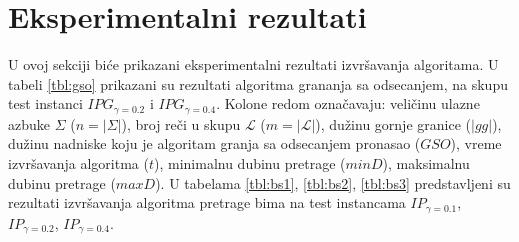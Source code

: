 \documentclass[12pt,oneside]{memoir}
\begin{document}
\section{Eksperimentalni rezultati}
\label{sec:ekspRezultati}
U ovoj sekciji biće prikazani eksperimentalni rezultati izvršavanja algoritama.
U tabeli \ref{tbl:gso} prikazani su rezultati algoritma grananja sa odsecanjem,
na skupu test instanci $IPG_{\gamma=0.2}$ i $IPG_{\gamma=0.4}$. 
Kolone redom označavaju: veličinu ulazne azbuke $\Sigma$ ($n=|\Sigma|$),
broj reči u skupu $\mathcal{L}$ ($m=|\mathcal{L}|$), dužinu gornje granice ($|gg|$),
dužinu nadniske koju je algoritam granja sa odsecanjem pronasao ($GSO$),
vreme izvršavanja algoritma ($t$),
minimalnu dubinu pretrage ($minD$),
maksimalnu dubinu pretrage ($maxD$).
U tabelama \ref{tbl:bs1}, \ref{tbl:bs2}, \ref{tbl:bs3} predstavljeni su rezultati
izvršavanja algoritma pretrage bima na test instancama
$IP_{\gamma=0.1}$, $IP_{\gamma=0.2}$, $IP_{\gamma=0.4}$.
\end{document}
